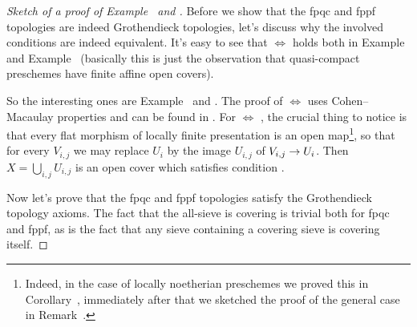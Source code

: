 \documentclass[a4paper,parskip=half,numbers=enddot, DIV=12]{scrreprt}
\begin{document}
\begin{proof}[Sketch of a proof of Example~ and ]
	Before we show that the fpqc and fppf topologies are indeed Grothendieck topologies, let's discuss why the involved conditions are indeed equivalent. It's easy to see that  $\Leftrightarrow$  holds both in Example~ and Example~ (basically this is just the observation that quasi-compact preschemes have finite affine open covers).
	
	So the interesting ones are Example~ and . The proof of  $\Leftrightarrow$  uses Cohen--Macaulay properties and can be found in \cite[]{stacks-project}. For  $\Leftrightarrow$ , the crucial thing to notice is that every flat morphism of locally finite presentation is an open map\footnote{Indeed, in the case of locally noetherian preschemes we proved this in Corollary~, immediately after that we sketched the proof of the general case in Remark~.}, so that for every $V_{i,j}$ we may replace $U_i$ by the image $U_{i,j}$ of $V_{i,j}\morphism U_i$. Then $X=\bigcup_{i,j}U_{i,j}$ is an open cover which satisfies condition .
	
	Now let's prove that the fpqc and fppf topologies satisfy the Grothendieck topology axioms. The fact that the all-sieve is covering is trivial both for fpqc and fppf, as is the fact that any sieve containing a covering sieve is covering itself.
	

\end{proof}
\end{document}
